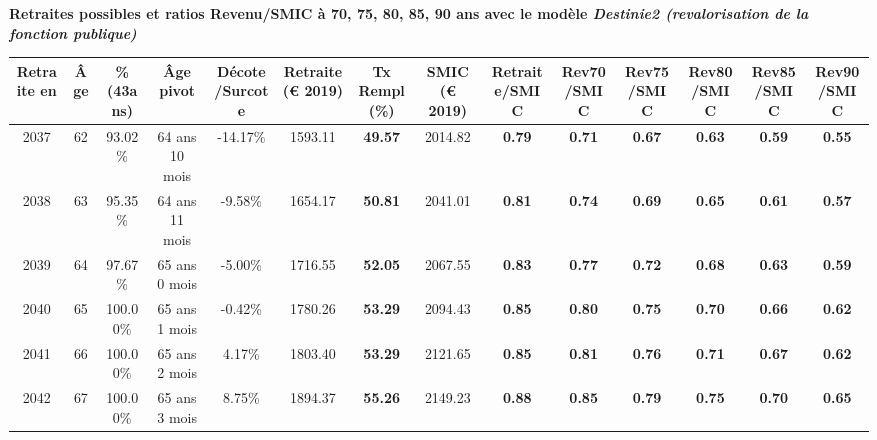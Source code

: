  \vspace{0.1cm} 
{\bf \noindent Retraites possibles et ratios Revenu/SMIC à 70, 75, 80, 85, 90 ans avec le modèle \emph{Destinie2 (revalorisation de la fonction publique)}}  
 
\begin{adjustbox}{max width=\textwidth} 
\begin{tabular}[htb]{|c|c||c|c|c||c|c||c||c|c|c|c|c|c|} 
\hline 
 Retraite en &  Âge &  \%(43ans) &  Âge pivot &  Décote/Surcote &  Retraite (\euro{} 2019) &  Tx Rempl(\%) &  SMIC (\euro{} 2019) &  Retraite/SMIC &  Rev70/SMIC &  Rev75/SMIC &  Rev80/SMIC &  Rev85/SMIC &  Rev90/SMIC \\ 
\hline \hline 
 2037 &  62 &  93.02\% &  64 ans 10 mois &  -14.17\% &  1593.11 &  {\bf 49.57} &  2014.82 &  {\bf {\color{red} 0.79}} &  {\bf {\color{red} 0.71}} &  {\bf {\color{red} 0.67}} &  {\bf {\color{red} 0.63}} &  {\bf {\color{red} 0.59}} &  {\bf {\color{red} 0.55}} \\ 
\hline 
 2038 &  63 &  95.35\% &  64 ans 11 mois &  -9.58\% &  1654.17 &  {\bf 50.81} &  2041.01 &  {\bf {\color{red} 0.81}} &  {\bf {\color{red} 0.74}} &  {\bf {\color{red} 0.69}} &  {\bf {\color{red} 0.65}} &  {\bf {\color{red} 0.61}} &  {\bf {\color{red} 0.57}} \\ 
\hline 
 2039 &  64 &  97.67\% &  65 ans 0 mois &  -5.00\% &  1716.55 &  {\bf 52.05} &  2067.55 &  {\bf {\color{red} 0.83}} &  {\bf {\color{red} 0.77}} &  {\bf {\color{red} 0.72}} &  {\bf {\color{red} 0.68}} &  {\bf {\color{red} 0.63}} &  {\bf {\color{red} 0.59}} \\ 
\hline 
 2040 &  65 &  100.00\% &  65 ans 1 mois &  -0.42\% &  1780.26 &  {\bf 53.29} &  2094.43 &  {\bf {\color{red} 0.85}} &  {\bf {\color{red} 0.80}} &  {\bf {\color{red} 0.75}} &  {\bf {\color{red} 0.70}} &  {\bf {\color{red} 0.66}} &  {\bf {\color{red} 0.62}} \\ 
\hline 
 2041 &  66 &  100.00\% &  65 ans 2 mois &  4.17\% &  1803.40 &  {\bf 53.29} &  2121.65 &  {\bf {\color{red} 0.85}} &  {\bf {\color{red} 0.81}} &  {\bf {\color{red} 0.76}} &  {\bf {\color{red} 0.71}} &  {\bf {\color{red} 0.67}} &  {\bf {\color{red} 0.62}} \\ 
\hline 
 2042 &  67 &  100.00\% &  65 ans 3 mois &  8.75\% &  1894.37 &  {\bf 55.26} &  2149.23 &  {\bf {\color{red} 0.88}} &  {\bf {\color{red} 0.85}} &  {\bf {\color{red} 0.79}} &  {\bf {\color{red} 0.75}} &  {\bf {\color{red} 0.70}} &  {\bf {\color{red} 0.65}} \\ 
\hline 
\hline 
\end{tabular} 
\end{adjustbox} 
 
